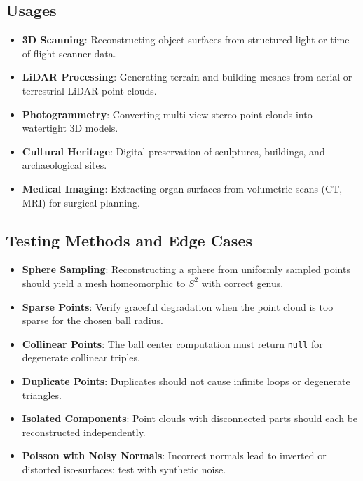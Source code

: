\subsection{Usages}
\begin{itemize}
\item \textbf{3D Scanning}: Reconstructing object surfaces from structured-light or time-of-flight scanner data.
\item \textbf{LiDAR Processing}: Generating terrain and building meshes from aerial or terrestrial LiDAR point clouds.
\item \textbf{Photogrammetry}: Converting multi-view stereo point clouds into watertight 3D models.
\item \textbf{Cultural Heritage}: Digital preservation of sculptures, buildings, and archaeological sites.
\item \textbf{Medical Imaging}: Extracting organ surfaces from volumetric scans (CT, MRI) for surgical planning.
\end{itemize}

\subsection{Testing Methods and Edge Cases}
\begin{itemize}
\item \textbf{Sphere Sampling}: Reconstructing a sphere from uniformly sampled points should yield a mesh homeomorphic to $S^2$ with correct genus.
\item \textbf{Sparse Points}: Verify graceful degradation when the point cloud is too sparse for the chosen ball radius.
\item \textbf{Collinear Points}: The ball center computation must return \texttt{null} for degenerate collinear triples.
\item \textbf{Duplicate Points}: Duplicates should not cause infinite loops or degenerate triangles.
\item \textbf{Isolated Components}: Point clouds with disconnected parts should each be reconstructed independently.
\item \textbf{Poisson with Noisy Normals}: Incorrect normals lead to inverted or distorted iso-surfaces; test with synthetic noise.
\end{itemize}

